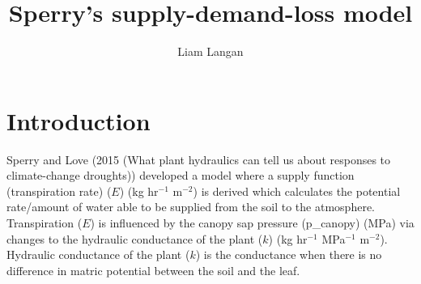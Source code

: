 \documentclass[a4paper]{article}\usepackage[]{graphicx}\usepackage[]{color}
\begin{document}
\title{Sperry's supply-demand-loss model}
\author{Liam Langan}
\maketitle


\section{Introduction}
Sperry and Love (2015 (What plant hydraulics can tell us about responses to climate-change droughts)) developed a model where a supply function (transpiration rate) ($E$) (kg hr$^{-1}$ m$^{-2}$) is derived which calculates the potential rate/amount of water able to be supplied from the soil to the atmosphere. Transpiration ($E$) is influenced by the canopy sap pressure (p\_canopy) (MPa) via changes to the hydraulic conductance of the plant ($k$) (kg hr$^{-1}$ MPa$^{-1}$ m$^{-2}$). Hydraulic conductance of the plant ($k$) is the conductance when there is no difference in matric potential between the soil and the leaf.  
\end{document}
